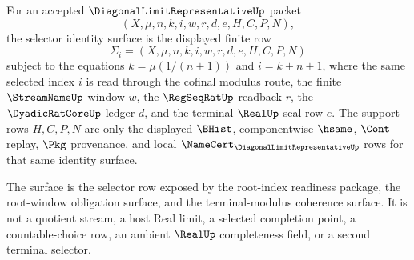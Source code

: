 \begin{definition}
\label{def:diagonal-limit-representative-selector-identity-surface}
For an accepted $\DiagonalLimitRepresentativeUp$ packet
$$
(X,\mu,n,k,i,w,r,d,e,H,C,P,N),
$$
the selector identity surface is the displayed finite row
$$
\Sigma_i=(X,\mu,n,k,i,w,r,d,e,H,C,P,N)
$$
subject to the equations $k=\mu(1/(n+1))$ and $i=k+n+1$, where the same selected index $i$ is read through the cofinal modulus route, the finite $\StreamNameUp$ window $w$, the $\RegSeqRatUp$ readback $r$, the $\DyadicRatCoreUp$ ledger $d$, and the terminal $\RealUp$ seal row $e$. The support rows $H,C,P,N$ are only the displayed $\BHist$, componentwise $\hsame$, $\Cont$ replay, $\Pkg$ provenance, and local $\NameCert_{\DiagonalLimitRepresentativeUp}$ rows for that same identity surface.

The surface is the selector row exposed by the root-index readiness package, the root-window obligation surface, and the terminal-modulus coherence surface. It is not a quotient stream, a host Real limit, a selected completion point, a countable-choice row, an ambient $\RealUp$ completeness field, or a second terminal selector.
\end{definition}

